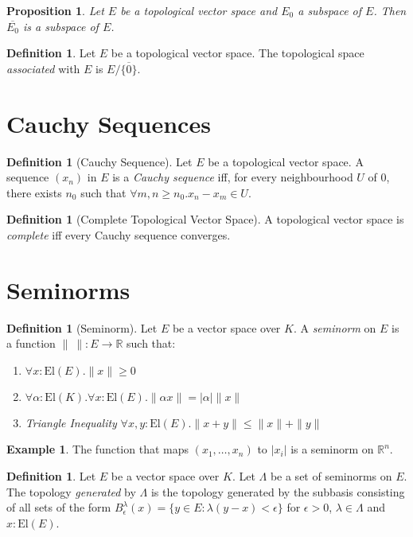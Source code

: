 \documentclass{book}
\newtheorem{prop}[ax]{Proposition}
\theoremstyle{definition}
\newtheorem{df}[ax]{Definition}
\newtheorem{ex}[ax]{Example}
\newcommand{\El}[1]{\ensuremath{\mathrm{El} \left( {#1} \right)}}
\begin{document}
\begin{prop}
Let $E$ be a topological vector space and $E_0$ a subspace of $E$. Then $\overline{E_0}$ is a subspace of $E$.
\end{prop}

\begin{df}
Let $E$ be a topological vector space. The topological space \emph{associated} with $E$ is $E / \overline{\{0\}}$.
\end{df}

\section{Cauchy Sequences}

\begin{df}[Cauchy Sequence]
Let $E$ be a topological vector space. A sequence $(x_n)$ in $E$ is a \emph{Cauchy sequence} iff, for every neighbourhood $U$ of 0, there exists $n_0$ such that $\forall m,n \geq n_0. x_n - x_m \in U$.
\end{df}

\begin{df}[Complete Topological Vector Space]
A topological vector space is \emph{complete} iff every Cauchy sequence converges.
\end{df}

\section{Seminorms}

\begin{df}[Seminorm]
Let $E$ be a vector space over $K$. A \emph{seminorm} on $E$ is a function $\|\ \| : E \rightarrow \mathbb{R}$ such that:
\begin{enumerate}
\item $\forall x : \El{E}. \| x \| \geq 0$
\item $\forall \alpha : \El{K}. \forall x : \El{E}. \| \alpha x \| = |\alpha| \|x\|$
\item \emph{Triangle Inequality} $\forall x,y : \El{E}. \| x + y \| \leq \| x \| + \| y \|$
\end{enumerate}
\end{df}

\begin{ex}
The function that maps $(x_1, \ldots, x_n)$ to $|x_i|$ is a seminorm on $\mathbb{R}^n$.
\end{ex}

\begin{df}
Let $E$ be a vector space over $K$.
Let $\Lambda$ be a set of seminorms on $E$. The topology \emph{generated} by $\Lambda$ is the topology generated by the subbasis consisting of all sets of the form $B_\epsilon^\lambda(x) = \{ y \in E : \lambda(y-x) < \epsilon \}$ for $\epsilon > 0$, $\lambda \in \Lambda$ and $x : \El{E}$.
\end{df}
\end{document}
